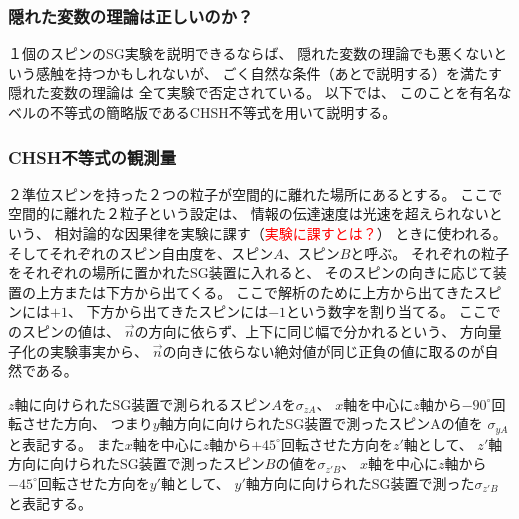 \documentclass[a4paper, 10pt]{jsarticle}
\begin{document}
\subsubsection{隠れた変数の理論は正しいのか？}
\label{subsubsec:question}
１個のスピンのSG実験を説明できるならば、
隠れた変数の理論でも悪くないという感触を持つかもしれないが、
ごく自然な条件（あとで説明する）を満たす隠れた変数の理論は
全て実験で否定されている。
以下では、
このことを有名なベルの不等式の簡略版であるCHSH不等式を用いて説明する。

\subsubsection{CHSH不等式の観測量}
２準位スピンを持った２つの粒子が空間的に離れた場所にあるとする。
ここで空間的に離れた２粒子という設定は、
情報の伝達速度は光速を超えられないという、
相対論的な因果律を実験に課す（\textcolor{red}{実験に課すとは？}）
ときに使われる。
そしてそれぞれのスピン自由度を、スピン$A$、スピン$B$と呼ぶ。
それぞれの粒子をそれぞれの場所に置かれたSG装置に入れると、
そのスピンの向きに応じて装置の上方または下方から出てくる。
ここで解析のために上方から出てきたスピンには$+1$、
下方から出てきたスピンには$-1$という数字を割り当てる。
ここでのスピンの値は、
$\vec{n}$の方向に依らず、上下に同じ幅で分かれるという、
方向量子化の実験事実から、
$\vec{n}$の向きに依らない絶対値が同じ正負の値に取るのが自然である。

$z$軸に向けられたSG装置で測られるスピン$A$を$\sigma_{zA}$、
$x$軸を中心に$z$軸から$-90^\circ$回転させた方向、
つまり$y$軸方向に向けられたSG装置で測ったスピンAの値を
$\sigma_{yA}$と表記する。
また$x$軸を中心に$z$軸から$+45^\circ$回転させた方向を$z'$軸として、
$z'$軸方向に向けられたSG装置で測ったスピン$B$の値を$\sigma_{z'B}$、
$x$軸を中心に$z$軸から$-45^\circ$回転させた方向を$y'$軸として、
$y'$軸方向に向けられたSG装置で測った$\sigma_{z'B}$と表記する。
\end{document}
